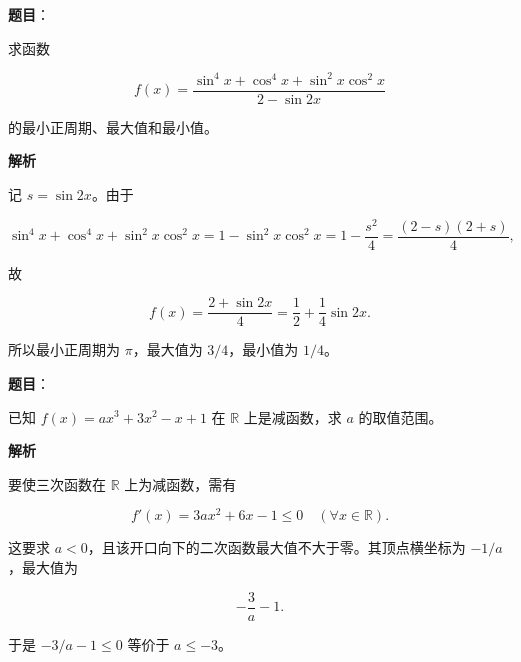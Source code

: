 \begin{answer}

\textbf{题目}：

求函数

\nopagebreak[4]
\[
f(x)=\frac{\sin^4x+\cos^4x+\sin^2x\cos^2x}{2-\sin2x}
\]

的最小正周期、最大值和最小值。

\textbf{解析}

记 $s=\sin2x$。由于

\nopagebreak[4]
\[
\sin^4x+\cos^4x+\sin^2x\cos^2x
=1-\sin^2x\cos^2x
=1-\frac{s^2}{4}
=\frac{(2-s)(2+s)}4,
\]

故

\nopagebreak[4]
\[
f(x)=\frac{2+\sin2x}{4}
=\frac12+\frac14\sin2x.
\]

所以最小正周期为 $\pi$，最大值为 $3/4$，最小值为 $1/4$。


\end{answer}
\begin{answer}

\textbf{题目}：

已知 $f(x)=ax^3+3x^2-x+1$ 在 $\mathbb R$ 上是减函数，求 $a$ 的取值范围。

\textbf{解析}

要使三次函数在 $\mathbb R$ 上为减函数，需有

\nopagebreak[4]
\[
f'(x)=3ax^2+6x-1\leqslant0\quad(\forall x\in\mathbb R).
\]

这要求 $a<0$，且该开口向下的二次函数最大值不大于零。其顶点横坐标为 $-1/a$，最大值为

\nopagebreak[4]
\[
-\frac3a-1.
\]

于是 $-3/a-1\leqslant0$ 等价于 $a\leqslant-3$。


\end{answer}
